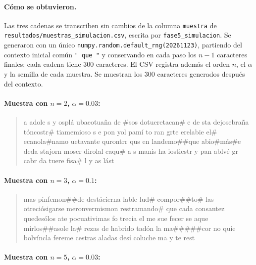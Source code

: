 \documentclass[11pt,letterpaper]{article}
\begin{document}
	\paragraph{Cómo se obtuvieron.}
	Las tres cadenas se transcriben sin cambios de la columna \texttt{muestra} de \texttt{resultados/muestras\_simulacion.csv}, escrita por \texttt{fase5\_simulacion}. Se generaron con un único \texttt{numpy.random.default\_rng(20261123)}, partiendo del contexto inicial común \texttt{" que "} y conservando en cada paso los $n - 1$ caracteres finales; cada cadena tiene 300 caracteres. El CSV registra además el orden $n$, el $\alpha$ y la semilla de cada muestra. Se muestran los 300 caracteres generados después del contexto.
	
	\paragraph{Muestra con $n = 2$, $\alpha = 0.03$:}
	\begin{quote}
		\ttfamily\small
		a adole s y osplá ubacotuaña de \#sos dotueretacan\# e de sta dejosebraña tóncostr\# tiamemioso s e pon yol pamí to ran grte erelabie el\# ecanola\#namo uetavante qurontrr qus en landemo\#\#que abio\#más\#e deda stajorn moser dirolal caqu\# a s manis ha iostiestr y pan ablvé gr cabr da tuere fisa\# l y as lást
	\end{quote}
	
	\paragraph{Muestra con $n = 3$, $\alpha = 0.1$:}
	\begin{quote}
		\ttfamily\small
		mas pinfemon\#\#de destácierna lable lud\# compor\#\#to\# las otreciósigarse meronvermismon restramando\# que cada consantez quedesólos ate pocuativimas fo trecia el me sue fecer se aque mirlos\#\#asole la\# rezas de habrido tadón la ma\#\#\#\#\#cor no quie bolvíncla fereme cestras aladas desí coluche ma y te rest
	\end{quote}
	
	\paragraph{Muestra con $n = 5$, $\alpha = 0.03$:}
	\begin{quote}
		\ttfamily\small
	\end{quote}
\end{document}
